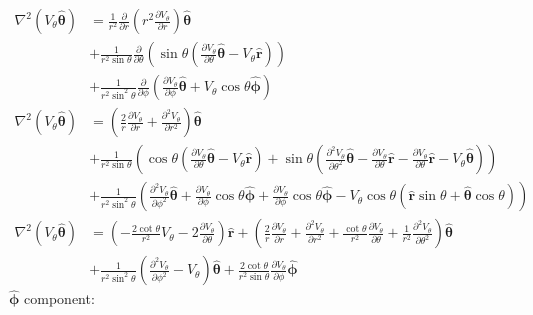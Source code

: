 \documentclass[MSc,beforeExam]{iitcsthesis}
\newcommand{\deriv}[2]{\frac{\partial #1}{\partial #2}}
\newcommand\Laplacian{\nabla^2}
\newcommand\br{\boldsymbol{r}}
\newcommand\brhat{\hat{\br}}
\newcommand\btheta{\boldsymbol{\theta}}
\newcommand\bthetahat{\hat{\btheta}}
\newcommand\bphi{\boldsymbol{\phi}}
\newcommand\bphihat{\hat{\bphi}}
\begin{document}
\begin{align}
\Laplacian (V_\theta\bthetahat) &= \nonumber
\frac{1}{r^2}\deriv{}{r}\left(r^2 \deriv{V_\theta}{r}\right)\bthetahat
\\ &+ \nonumber
\frac{1}{r^2\sin\theta}\deriv{}{\theta}\left(
\sin\theta\left(\deriv{V_\theta}{\theta}\bthetahat - V_\theta\brhat \right)\right)
\\ &+ \nonumber
\frac{1}{r^2 \sin^2\theta}\deriv{}{\phi}\left(
\deriv{V_\theta}{\phi}\bthetahat + V_\theta \cos\theta\bphihat
\right)
\\ 
\Laplacian (V_\theta\bthetahat) &=
\left(\frac{2}{r}\deriv{V_\theta}{r} + \deriv{^2V_\theta}{r^2}\right)\bthetahat
\\ &+ \nonumber
\frac{1}{r^2\sin\theta}\left(
\cos\theta\left(\deriv{V_\theta}{\theta}\bthetahat - V_\theta\brhat \right) +
\sin\theta\left(\deriv{^2V_\theta}{\theta^2}\bthetahat - \deriv{V_\theta}{\theta}\brhat
-\deriv{V_\theta}{\theta}\brhat - V_\theta\bthetahat\right)
\right)
\\ &+ \nonumber
\frac{1}{r^2 \sin^2\theta}\left(
\deriv{^2V_\theta}{\phi^2}\bthetahat + \deriv{V_\theta}{\phi} \cos\theta\bphihat +
\deriv{V_\theta}{\phi}\cos\theta\bphihat
- V_\theta \cos\theta \left(\brhat \sin\theta + \bthetahat \cos\theta \right)
\right)
\\ \nonumber
\Laplacian (V_\theta\bthetahat) &=
\left(-\frac{2\cot\theta}{r^2}V_\theta - 2\deriv{V_\theta}{\theta}\right)\brhat +
\left(\frac{2}{r}\deriv{V_\theta}{r} + \deriv{^2V_\theta}{r^2} +
\frac{\cot\theta}{r^2} \deriv{V_\theta}{\theta} +
\frac{1}{r^2}\deriv{^2V_\theta}{\theta^2}\right)\bthetahat
\\ &+ \nonumber
\frac{1}{r^2 \sin^2\theta}\left(
\deriv{^2V_\theta}{\phi^2} - V_\theta \right)\bthetahat
+ \frac{2 \cot\theta}{r^2 \sin\theta} \deriv{V_\theta}{\phi} \bphihat
\end{align}
$\bphihat$ component:
\end{document}
